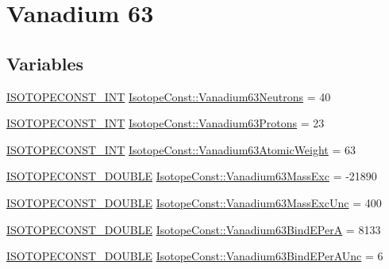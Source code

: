 \hypertarget{group___isotope_const-_vanadium-_v63}{}\section{Vanadium 63}
\label{group___isotope_const-_vanadium-_v63}
\subsection*{Variables}
\begin{DoxyCompactItemize}
\item 
\mbox{\hyperlink{group___isotope_const-_macros_ga5f18360b3e99483a35c32d789e62621c}{I\+S\+O\+T\+O\+P\+E\+C\+O\+N\+S\+T\+\_\+\+I\+NT}} \mbox{\hyperlink{group___isotope_const-_vanadium-_v63_gad6383e6da2490b567330e47bd66a38e6}{Isotope\+Const\+::\+Vanadium63\+Neutrons}} = 40
\item 
\mbox{\hyperlink{group___isotope_const-_macros_ga5f18360b3e99483a35c32d789e62621c}{I\+S\+O\+T\+O\+P\+E\+C\+O\+N\+S\+T\+\_\+\+I\+NT}} \mbox{\hyperlink{group___isotope_const-_vanadium-_v63_gabee10ebabd3501184d843872010a82f8}{Isotope\+Const\+::\+Vanadium63\+Protons}} = 23
\item 
\mbox{\hyperlink{group___isotope_const-_macros_ga5f18360b3e99483a35c32d789e62621c}{I\+S\+O\+T\+O\+P\+E\+C\+O\+N\+S\+T\+\_\+\+I\+NT}} \mbox{\hyperlink{group___isotope_const-_vanadium-_v63_gac0582c5ce47a64e9681251d1d5fa58e6}{Isotope\+Const\+::\+Vanadium63\+Atomic\+Weight}} = 63
\item 
\mbox{\hyperlink{group___isotope_const-_macros_ga8f45a7272ce02c0b4c65c44636ed719a}{I\+S\+O\+T\+O\+P\+E\+C\+O\+N\+S\+T\+\_\+\+D\+O\+U\+B\+LE}} \mbox{\hyperlink{group___isotope_const-_vanadium-_v63_gafc087b3d2ae3a1648c48931011247140}{Isotope\+Const\+::\+Vanadium63\+Mass\+Exc}} = -\/21890
\item 
\mbox{\hyperlink{group___isotope_const-_macros_ga8f45a7272ce02c0b4c65c44636ed719a}{I\+S\+O\+T\+O\+P\+E\+C\+O\+N\+S\+T\+\_\+\+D\+O\+U\+B\+LE}} \mbox{\hyperlink{group___isotope_const-_vanadium-_v63_gacfba1455fd52df9d6bf59f246e638e90}{Isotope\+Const\+::\+Vanadium63\+Mass\+Exc\+Unc}} = 400
\item 
\mbox{\hyperlink{group___isotope_const-_macros_ga8f45a7272ce02c0b4c65c44636ed719a}{I\+S\+O\+T\+O\+P\+E\+C\+O\+N\+S\+T\+\_\+\+D\+O\+U\+B\+LE}} \mbox{\hyperlink{group___isotope_const-_vanadium-_v63_gad0aa50184723b0bca93711fcc8029e88}{Isotope\+Const\+::\+Vanadium63\+Bind\+E\+PerA}} = 8133
\item 
\mbox{\hyperlink{group___isotope_const-_macros_ga8f45a7272ce02c0b4c65c44636ed719a}{I\+S\+O\+T\+O\+P\+E\+C\+O\+N\+S\+T\+\_\+\+D\+O\+U\+B\+LE}} \mbox{\hyperlink{group___isotope_const-_vanadium-_v63_ga8c1695226b30f30a17eeb3602707c653}{Isotope\+Const\+::\+Vanadium63\+Bind\+E\+Per\+A\+Unc}} = 6

\end{DoxyCompactItemize}
